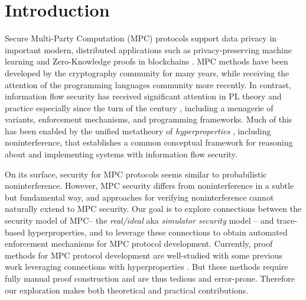 \section{Introduction}

Secure Multi-Party Computation (MPC) protocols support data privacy in
important modern, distributed applications such as privacy-preserving
machine learning \cite{li2021privacy, knott2021crypten,
  koch2020privacy, liu2020privacy} and Zero-Knowledge proofs in
blockchains \cite{ishai2009zero, lu2019honeybadgermpc,
  gao2022symmeproof, tomaz2020preserving}. MPC methods have been
developed by the cryptography community for many years, while
receiving the attention of the programming languages community more
recently. In contrast, information flow security has received
significant attention in PL theory and practice especially since the
turn of the century \cite{1159651}, including a menagerie of variants,
enforcement mechanisms, and programming frameworks. Much of this has
been enabled by the unified metatheory of \emph{hyperproperties}
\cite{10.5555/1891823.1891830}, including noninterference, that
establishes a common conceptual framework for reasoning about and
implementing systems with information flow security.

On its surface, security for MPC protocols seems similar to
probabilistic noninterference. However, MPC security differs from
noninterference in a subtle but fundamental way, and approaches for
verifying noninterference cannot naturally extend to MPC security. Our
goal is to explore connections between the security model of MPC-- the
\emph{real/ideal} aka \emph{simulator security} model -- and
trace-based hyperproperties, and to leverage these connections to
obtain automated enforcement mechanisms for MPC protocol
development. Currently, proof methods for MPC protocol development are
well-studied \cite{Lindell2017} with some previous work leveraging
connections with hyperproperties \cite{8429300}. But these methods
require fully manual proof construction and are thus tedious and
error-prone. Therefore our exploration makes both theoretical and
practical contributions.

